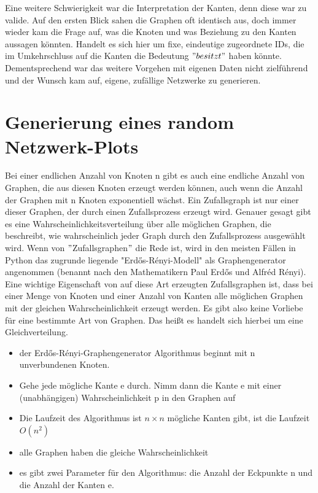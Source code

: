 Eine weitere Schwierigkeit war die Interpretation der Kanten, denn diese war zu valide. 
Auf den ersten Blick sahen die Graphen oft identisch aus, doch immer wieder kam die Frage auf, was die Knoten und was Beziehung zu den Kanten aussagen könnten. Handelt es sich hier um fixe, eindeutige zugeordnete IDs, die im Umkehrschluss auf die Kanten die Bedeutung $"besitzt"$ haben könnte.\\
Dementsprechend war das weitere Vorgehen mit eigenen Daten nicht zielführend und der Wunsch kam auf, eigene, zufällige Netzwerke zu generieren. 

\section{Generierung eines random Netzwerk-Plots} 
Bei einer endlichen Anzahl von Knoten n gibt es auch eine endliche Anzahl von Graphen, die aus diesen Knoten erzeugt werden können, auch wenn die Anzahl der Graphen mit n Knoten exponentiell wächst.
Ein Zufallsgraph ist nur einer dieser Graphen, der durch einen Zufallsprozess erzeugt wird.
Genauer gesagt gibt es eine Wahrscheinlichkeitsverteilung über alle möglichen Graphen, die beschreibt, wie wahrscheinlich jeder Graph durch den Zufallsprozess ausgewählt wird.
Wenn von $"$Zufallsgraphen$"$ die Rede ist, wird in den meisten Fällen in Python das zugrunde liegende "Erdős-Rényi-Modell" als Graphengenerator angenommen (benannt nach den Mathematikern Paul Erdős und Alfréd Rényi). Eine wichtige Eigenschaft von auf diese Art erzeugten Zufallsgraphen ist, dass bei einer Menge von Knoten und einer Anzahl von Kanten alle möglichen Graphen mit der gleichen Wahrscheinlichkeit erzeugt werden. Es gibt also keine Vorliebe für eine bestimmte Art von Graphen. Das heißt es handelt sich hierbei um eine Gleichverteilung.

\begin{itemize}
    \item der Erdős-Rényi-Graphengenerator Algorithmus beginnt mit n unverbundenen Knoten.
    \item Gehe jede mögliche Kante e durch. Nimm dann die Kante e mit einer (unabhängigen) Wahrscheinlichkeit p in den Graphen auf
    \item Die Laufzeit des Algorithmus ist $n \times n$ mögliche Kanten gibt, ist die Laufzeit $O(n^2)$
    \item alle Graphen haben die gleiche Wahrscheinlichkeit
    \item es gibt zwei Parameter für den Algorithmus: die Anzahl der Eckpunkte n und die Anzahl der Kanten e.
\end{itemize}

